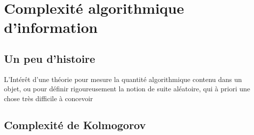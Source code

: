 \chapter{Complexité algorithmique d'information}
\section{Un peu d'histoire}
L’Intérêt d'une théorie pour mesure la quantité algorithmique contenu dans un objet, ou pour définir 
rigoureusement la notion de suite aléatoire, qui à priori une chose très difficile à concevoir
\section{Complexité de Kolmogorov}
\begin{definition}
\end{definition}
